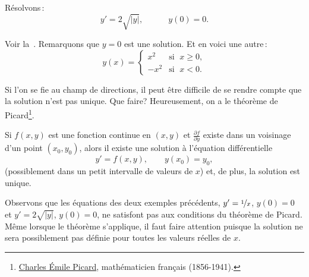 \begin{example}
Résolvons\,:
\begin{equation*}
	y' = 2 \sqrt{\lvert y \rvert},\quad\qquad y(0) = 0 .
\end{equation*}

Voir la~.
Remarquons que $y=0$ est une solution.  Et en voici une autre\,:
\begin{equation*}
y(x) =
\begin{cases}
x^2 & \text{si } \; x \geq 0,\\
-x^2 & \text{si } \; x < 0.
\end{cases}
\end{equation*}
\end{example}
Si l'on se fie au champ de directions, il peut être difficile de se rendre compte que la solution n'est pas unique.  Que faire?  Heureusement, on a le théorème de Picard\footnote{
\href{https://fr.wikipedia.org/wiki/Charles_\%C3\%89mile_Picard}{Charles Émile Picard}, mathématicien français
(1856-1941).}. 

\begin{theorem}%
\label{slope:picardthm}%
Si $f(x,y)$ est une fonction continue en $(x,y)$ et $\frac{\partial f}{\partial y}$ existe dans un voisinage d'un point $(x_0,y_0)$, alors il existe une solution à l'équation différentielle
\begin{equation*}
	y' = f(x,y), \qquad y(x_0) = y_0,
\end{equation*}
(possiblement dans un petit intervalle de valeurs de $x$) et, de plus, la solution est unique.
\end{theorem}

Observons que les équations des deux exemples précédents, $y' = \nicefrac{1}{x}$, $y(0) = 0$ et 
$y' = 2 \sqrt{\lvert y \rvert}$, $y(0) = 0$, ne satisfont pas aux conditions du théorème de Picard.  Même lorsque le théorème s'applique, il faut faire attention puisque la solution ne sera possiblement pas définie pour toutes les valeurs réelles de $x$.

